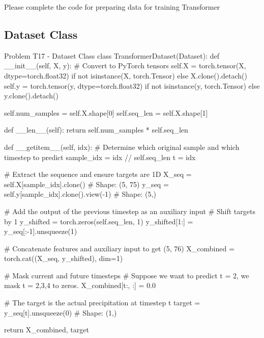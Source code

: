 \documentclass[12pt, a4paper]{article}
\begin{document}
            \vspace{0.5em}

            \noindent Please complete the code for preparing data for training Transformer

            \subsection{Dataset Class}
                \begin{codeblock}{Problem T17 - Dataset Class}
                    class TransformerDataset(Dataset):
                        def __init__(self, X, y):
                            # Convert to PyTorch tensors
                            self.X = torch.tensor(X, dtype=torch.float32) if not isinstance(X, torch.Tensor) else X.clone().detach()
                            self.y = torch.tensor(y, dtype=torch.float32) if not isinstance(y, torch.Tensor) else y.clone().detach()

                            self.num_samples = self.X.shape[0]
                            self.seq_len = self.X.shape[1]

                        def __len__(self):
                            return self.num_samples * self.seq_len

                        def __getitem__(self, idx):
                            # Determine which original sample and which timestep to predict
                            sample_idx = idx // self.seq_len
                            t = idx %

                            # Extract the sequence and ensure targets are 1D
                            X_seq = self.X[sample_idx].clone() # Shape: (5, 75)
                            y_seq = self.y[sample_idx].clone().view(-1) # Shape: (5,)

                            # Add the output of the previous timestep as an auxiliary input
                            # Shift targets by 1
                            y_shifted = torch.zeros(self.seq_len, 1)
                            y_shifted[1:] = y_seq[:-1].unsqueeze(1)
                            
                            # Concatenate features and auxiliary input to get (5, 76)
                            X_combined = torch.cat((X_seq, y_shifted), dim=1) 
                            
                            # Mask current and future timesteps
                            # Suppose we want to predict t = 2, we mask t = 2,3,4 to zeros.
                            X_combined[t:, :] = 0.0
                            
                            # The target is the actual precipitation at timestep t
                            target = y_seq[t].unsqueeze(0) # Shape: (1,)

                            return X_combined, target
                \end{codeblock}
\end{document}
